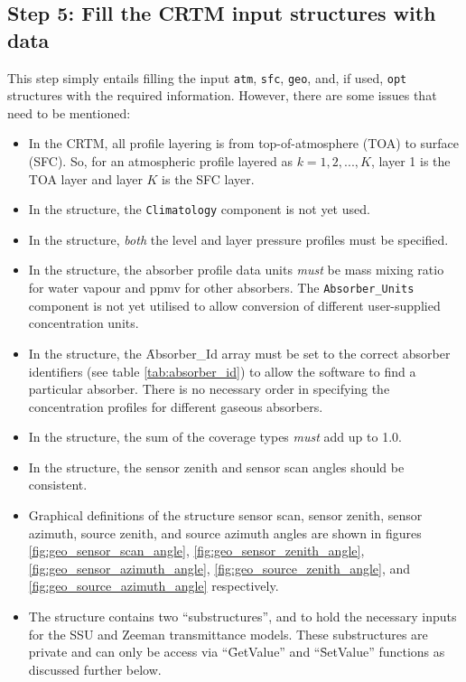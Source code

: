 \subsection{Step 5: Fill the CRTM input structures with data}
\label{sec:fill_step}
This step simply entails filling the input \texttt{atm}, \texttt{sfc}, \texttt{geo}, and, if used, \texttt{opt} structures with the required information. However, there are some issues that need to be mentioned:
\begin{itemize}
  \item In the CRTM, all profile layering is from top-of-atmosphere (TOA) to surface (SFC). So, for an atmospheric profile layered as $k = 1,2,...,K$, layer 1 is the TOA layer and layer $K$ is the SFC layer.
  \item In the \hyperref[sec:atmosphere_structure]{\Atmosphere} structure, the \texttt{Climatology} component is not yet used.
  \item In the \hyperref[sec:atmosphere_structure]{\Atmosphere} structure, \emph{both} the level and layer pressure profiles must be specified.
  \item In the \hyperref[sec:atmosphere_structure]{\Atmosphere} structure, the absorber profile data units \emph{must} be mass mixing ratio for water vapour and ppmv for other absorbers. The \texttt{Absorber\_Units} component is not yet utilised to allow conversion of different user-supplied concentration units.
  \item In the \hyperref[sec:atmosphere_structure]{\Atmosphere} structure, the \f{Absorber\_Id} array must be set to the correct absorber identifiers (see table \ref{tab:absorber_id}) to allow the software to find a particular absorber. There is no necessary order in specifying the concentration profiles for different gaseous absorbers.
  \item In the \hyperref[sec:surface_structure]{\Surface} structure, the sum of the coverage types \emph{must} add up to 1.0.
  \item In the \hyperref[sec:geometry_structure]{\Geometry} structure, the sensor zenith and sensor scan angles should be consistent.
  \item Graphical definitions of the \hyperref[sec:geometry_structure]{\Geometry} structure sensor scan, sensor zenith, sensor azimuth, source zenith, and source azimuth angles are shown in figures \ref{fig:geo_sensor_scan_angle}, \ref{fig:geo_sensor_zenith_angle}, \ref{fig:geo_sensor_azimuth_angle}, \ref{fig:geo_source_zenith_angle}, and  \ref{fig:geo_source_azimuth_angle} respectively.
  \item The \hyperref[sec:options_structure]{\Options} structure contains two ``substructures'', \hyperref[sec:ssu_input_structure]{\SSUInput} and \hyperref[sec:zeeman_input_structure]{\ZeemanInput} to hold the necessary inputs for the SSU and Zeeman transmittance models. These substructures are private and can only be access via ``\f{GetValue}'' and ``\f{SetValue}'' functions as discussed further below.
\end{itemize}
